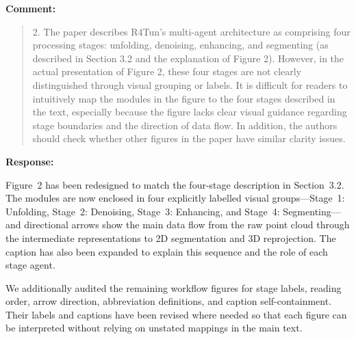 \documentclass[11pt,a4paper]{article}
\newenvironment{commentblock}{%
  \par\smallskip\noindent\textbf{Comment:}\par
  \begin{quote}\itshape\color{black}
}{%
  \end{quote}\smallskip
}
\newenvironment{responseblock}{%
  \par\smallskip\noindent\textbf{Response:}\par
  \begingroup\color{responsegreen}
}{%
  \endgroup\smallskip
}
\begin{document}
\begin{commentblock}
2. The paper describes R4Tun's multi-agent architecture as comprising four processing stages: unfolding, denoising, enhancing, and segmenting (as described in Section 3.2 and the explanation of Figure 2). However, in the actual presentation of Figure 2, these four stages are not clearly distinguished through visual grouping or labels. It is difficult for readers to intuitively map the modules in the figure to the four stages described in the text, especially because the figure lacks clear visual guidance regarding stage boundaries and the direction of data flow. In addition, the authors should check whether other figures in the paper have similar clarity issues.
\end{commentblock}
\begin{responseblock}
Figure~2 has been redesigned to match the four-stage description in Section~3.2. The modules are now enclosed in four explicitly labelled visual groups---Stage~1: Unfolding, Stage~2: Denoising, Stage~3: Enhancing, and Stage~4: Segmenting---and directional arrows show the main data flow from the raw point cloud through the intermediate representations to 2D segmentation and 3D reprojection. The caption has also been expanded to explain this sequence and the role of each stage agent.

We additionally audited the remaining workflow figures for stage labels, reading order, arrow direction, abbreviation definitions, and caption self-containment. Their labels and captions have been revised where needed so that each figure can be interpreted without relying on unstated mappings in the main text.
\end{responseblock}
\end{document}
